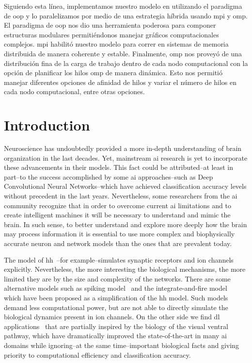 {Siguiendo esta línea, implementamos nuestro modelo en  utilizando el paradigma de \gls{oop} y lo paralelizamos por medio de una estrategia híbrida usando \gls{mpi} y \gls{omp}.
El paradigma de \gls{oop} nos dio una herramienta poderosa para componer estructuras modulares permitiéndonos manejar gráficos computacionales complejos. \gls{mpi} habilitó nuestro modelo para correr en sistemas de memoria distribuida de manera coherente y estable.
Finalmente, \gls{omp} nos proveyó de una distribución fina de la carga de trabajo dentro de cada nodo computacional con la opción de planificar los hilos \gls{omp} de manera dinámica.
Esto nos permitió manejar diferentes opciones de afinidad de hilos y variar el número de hilos en cada nodo computacional, entre otras opciones.
}{
\section{Introduction}

Neuroscience has undoubtedly provided a more in-depth understanding of brain organization in the last decades. Yet, mainstream \gls{ai} research is yet to incorporate these advancements in their models. This fact could be attributed--at least in part--to the success accomplished by some \gls{ai} approaches--such as Deep Convolutional Neural Networks--which have achieved classification accuracy levels without precedent in the last years. Nevertheless, some researchers from the \gls{ai} community recognize that in order to overcome current \gls{ai} limitations and to create intelligent machines it will be necessary to understand and mimic the brain. In such sense, to better understand and explore more deeply how the brain may process information it is essential to use more complex and biophysically accurate neuron and network models than the ones that are prevalent today.

The model of \gls{hh}~\cite{HODGKIN199025}--for example--simulates synaptic receptors and ion channels explicitly. Nevertheless, the more interesting the biological mechanisms, the more limited they are by the size and complexity of the networks. There are some alternative models such as spiking model~\cite{Izhikevich2004SpiketimingDO} and the integrate-and-fire model~\cite{1333071} which have been proposed as a simplification of the \gls{hh} model. Such models demand less computational power, but are not able to directly simulate the biological dynamics present in ion channels. On the other side we find \gls{dl} applications~\cite{lecun_deep_2015} that are partially inspired by the biology of the visual ventral pathway, which have dramatically improved the state-of-the-art in many \gls{ai} domains while ignoring--at the same time--important biological facts and giving priority to computational efficiency and classification accuracy. 

}
